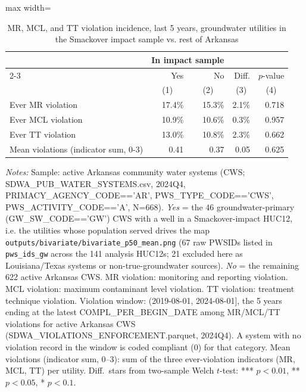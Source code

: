 \begin{table}[htbp]
\centering
\caption{MR, MCL, and TT violation incidence, last 5 years, groundwater utilities in the Smackover impact sample vs. rest of Arkansas}
\label{tab:huc12_utility_violation_comparison}
\begin{adjustbox}{max width=\textwidth}
\begin{tabular}{lrrrr}
\toprule
 & \multicolumn{2}{c}{In impact sample} & & \\
\cmidrule(lr){2-3}
 & Yes & No & Diff. & $p$-value \\
 & \multicolumn{1}{c}{(1)} & \multicolumn{1}{c}{(2)} & \multicolumn{1}{c}{(3)} & \multicolumn{1}{c}{(4)} \\
\hline
Ever MR violation & 17.4\% & 15.3\% & 2.1\% & 0.718 \\
Ever MCL violation & 10.9\% & 10.6\% & 0.3\% & 0.957 \\
Ever TT violation & 13.0\% & 10.8\% & 2.3\% & 0.662 \\
\hline
Mean violations (indicator sum, 0-3) & 0.41 & 0.37 & 0.05 & 0.625 \\
\bottomrule
\end{tabular}
\end{adjustbox}
\begin{minipage}{\linewidth}
\vspace{4pt}
\footnotesize
\raggedright
\textit{Notes:} Sample: active Arkansas community water systems (CWS; SDWA\_PUB\_WATER\_SYSTEMS.csv, 2024Q4, PRIMACY\_AGENCY\_CODE=='AR', PWS\_TYPE\_CODE=='CWS', PWS\_ACTIVITY\_CODE=='A', N=668). \textit{Yes} = the 46 groundwater-primary (GW\_SW\_CODE=='GW') CWS with a well in a Smackover-impact HUC12, i.e. the utilities whose population served drives the map \texttt{outputs/bivariate/bivariate\_p50\_mean.png} (67 raw PWSIDs listed in \texttt{pws\_ids\_gw} across the 141 analysis HUC12s; 21 excluded here as Louisiana/Texas systems or non-true-groundwater sources). \textit{No} = the remaining 622 active Arkansas CWS. MR violation: monitoring and reporting violation. MCL violation: maximum contaminant level violation. TT violation: treatment technique violation. Violation window: (2019-08-01, 2024-08-01], the 5 years ending at the latest COMPL\_PER\_BEGIN\_DATE among MR/MCL/TT violations for active Arkansas CWS (SDWA\_VIOLATIONS\_ENFORCEMENT.parquet, 2024Q4). A system with no violation record in the window is coded compliant (0) for that category. Mean violations (indicator sum, 0--3): sum of the three ever-violation indicators (MR, MCL, TT) per utility. Diff.\ stars from two-sample Welch $t$-test: *** $p<0.01$, ** $p<0.05$, * $p<0.1$.
\end{minipage}
\end{table}
